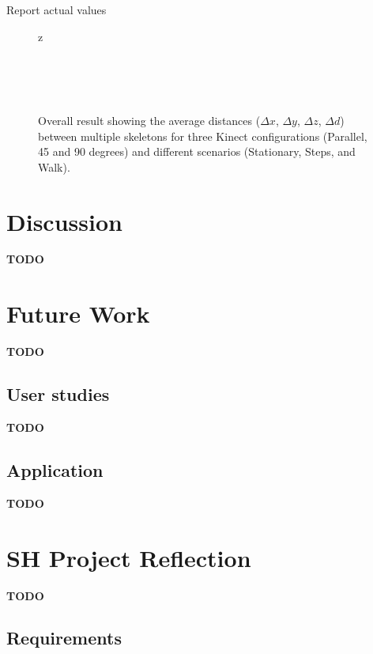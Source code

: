 \documentclass{sigchi}
\begin{document}
Report actual values


\begin{figure}z
  \centering

   \\
   \\
   \\

  \caption{Overall result showing the average distances ($\Delta x$, $\Delta y$, $\Delta z$, $\Delta d$) between multiple skeletons
    for three Kinect configurations (Parallel, 45 and 90 degrees) and different scenarios (Stationary, Steps, and Walk).}

  \label{fig:results_steps}
\end{figure}


\section{Discussion}

\textbf{TODO}

\section{Future Work}
\label{sec:future_work}

\textbf{TODO}

\subsection{User studies}

\textbf{TODO}

\subsection{Application}

\textbf{TODO}

\section{SH Project Reflection}

\textbf{TODO}

\subsection{Requirements}
\end{document}
